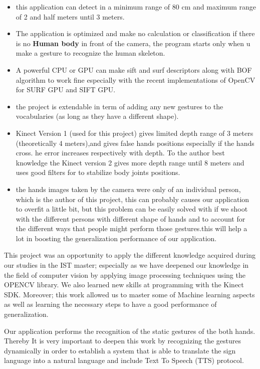 \begin{itemize}
    \item this application can detect  in a minimum range of 80 cm and maximum range of 2 and half meters until 3 meters.
    \item The application is optimized and make no calculation or classification if there is no \textbf{Human body} in front of the camera, the program starts only when u make a gesture to recognize the human skeleton.
    \item A powerful CPU or  GPU can make  sift and surf descriptors along with BOF algorithm to work fine especially with the recent implementations of OpenCV for SURF GPU and SIFT GPU.
    \item the project is extendable in term of adding any new gestures to the vocabularies (as long as  they have a different shape).
    \item Kinect Version 1 (used for this project) gives limited depth range of 3 meters (theoretically 4 meters),and gives false hands positions  especially if the hands cross. he error increases respectively with depth.  To the author  best knowledge the Kinect version 2 gives more depth range until 8 meters and uses good filters for to stabilize body joints positions. 
    \item the hands images taken by the camera were only of an individual person, which is the author of this project, this can probably causes our application to overfit a little bit, but this problem can be easily solved with if we shoot with  the different persons with different shape of hands and to account for the different ways that people might perform those gestures.this will help a lot in boosting the generalization performance of our application.
   
\end{itemize}


This project was an opportunity to apply the different knowledge acquired during our studies in the IST master; especially as we have deepened our knowledge in the field of computer vision by applying image processing techniques using the OPENCV library. We also learned new skills at programming with the Kinect SDK. Moreover; this work allowed us to master some of Machine learning aspects as well as learning the necessary steps to have a good performance of generalization.


Our application performs the recognition of the static gestures of the both  hands. Thereby It is very important to deepen this work by recognizing the gestures dynamically in order to establish a system that is able to translate the sign language into a natural language and include Text To Speech (TTS) protocol. 


